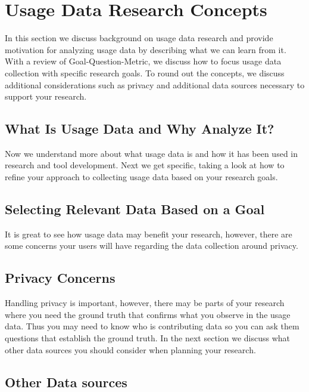 
\section{Usage Data Research Concepts}

In this section we discuss background on usage data research and provide motivation for analyzing usage data by describing what we can learn from it.  With a review of Goal-Question-Metric, we discuss how to focus usage data collection with specific research goals.  To round out the concepts, we discuss additional considerations such as privacy and additional data sources necessary to support your research.  

\subsection{What Is Usage Data and Why Analyze It?}

\vspace{0.1in}
Now we understand more about what usage data is and how it has been used in research and tool development.  Next we get specific, taking a look at how to refine your approach to collecting usage data based on your research goals.

\subsection{Selecting Relevant Data Based on a Goal}


\vspace{0.1in}
It is great to see how usage data may benefit your research, however, there are some concerns your users will have regarding the data collection around privacy.  

\subsection{Privacy Concerns}


\vspace{0.1in}
Handling privacy is important, however, there may be parts of your research where you need the ground truth that confirms what you observe in the usage data.  Thus you may need to know who is contributing data so you can ask them questions that establish the ground truth.  In the next section we discuss what other data sources you should consider when planning your research.

\subsection{Other Data sources}


